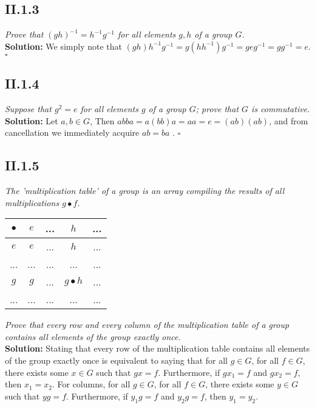 \documentclass[11pt,a4paper]{article}
\begin{document}
\subsection*{II.1.3} \textit{Prove that $(gh)^{-1}=h^{-1}g^{-1}$ for all elements $g,h$ of a group $G$.}\\

\noindent \textbf{Solution: } We simply note that $(gh)h^{-1}g^{-1}= g(hh^{-1}) g^{-1}= geg^{-1} = gg^{-1} = e$. $\square$

\subsection*{II.1.4} \textit{Suppose that $g^2 = e$ for all elements $g$ of a group $G$; prove that $G$ is commutative.} \\

\noindent \textbf{Solution: } Let $a,b \in G$, Then $abba = a(bb)a = aa = e = (ab)(ab)$, and from cancellation we immediately acquire $ab = ba$ . $\square$ 

\subsection*{II.1.5} \textit{The 'multiplication table' of a group is an array compiling the results of all multiplications $g \bullet f$.}


\begin{center}
\begin{tabular}{c||c|c|c|c}
	$\bullet$ & $e$ & ... & $h$ & ... \\ \hline \hline
	$e$ & $e$ & ... & $h$ & ... \\ \hline
	... & ... &... &... &... \\ \hline
	$g$ & $g$ & ... & $g \bullet h$ & ... \\ \hline
	... & ... &... &... &... \\
\end{tabular}
\end{center}

\noindent\textit{Prove that every row and every column of the multiplication table of a group contains all elements of the group exactly once.}\\

\noindent \textbf{Solution:} Stating that every row of the multiplication table contains all elements of the group exactly once is equivalent to saying that for all $g \in G$, for all $f \in G$, there exists some $x \in G$ such that $gx = f$. Furthermore, if $gx_1 = f$ and $gx_2 = f$, then $x_1 = x_2$.  For columns, for all $g \in G$, for all $f \in G$, there exists some $y \in G$ such that $yg = f$. Furthermore, if $y_1g = f$ and $y_2g = f$, then $y_1 = y_2$. \\
\end{document}
